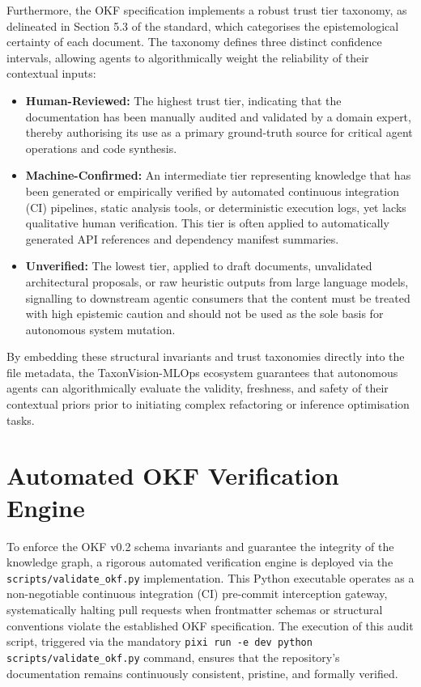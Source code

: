 Furthermore, the OKF specification implements a robust trust tier taxonomy, as delineated in Section 5.3 of the standard, which categorises the epistemological certainty of each document. The taxonomy defines three distinct confidence intervals, allowing agents to algorithmically weight the reliability of their contextual inputs:
\begin{itemize}
    \item \textbf{Human-Reviewed:} The highest trust tier, indicating that the documentation has been manually audited and validated by a domain expert, thereby authorising its use as a primary ground-truth source for critical agent operations and code synthesis.
    \item \textbf{Machine-Confirmed:} An intermediate tier representing knowledge that has been generated or empirically verified by automated continuous integration (CI) pipelines, static analysis tools, or deterministic execution logs, yet lacks qualitative human verification. This tier is often applied to automatically generated API references and dependency manifest summaries.
    \item \textbf{Unverified:} The lowest tier, applied to draft documents, unvalidated architectural proposals, or raw heuristic outputs from large language models, signalling to downstream agentic consumers that the content must be treated with high epistemic caution and should not be used as the sole basis for autonomous system mutation.
\end{itemize}

By embedding these structural invariants and trust taxonomies directly into the file metadata, the TaxonVision-MLOps ecosystem guarantees that autonomous agents can algorithmically evaluate the validity, freshness, and safety of their contextual priors prior to initiating complex refactoring or inference optimisation tasks.

\section{Automated OKF Verification Engine}
\label{sec:okf_verification_engine}

To enforce the OKF v0.2 schema invariants and guarantee the integrity of the knowledge graph, a rigorous automated verification engine is deployed via the \texttt{scripts/validate\_okf.py} implementation. This Python executable operates as a non-negotiable continuous integration (CI) pre-commit interception gateway, systematically halting pull requests when frontmatter schemas or structural conventions violate the established OKF specification. The execution of this audit script, triggered via the mandatory \texttt{pixi run -e dev python scripts/validate\_okf.py} command, ensures that the repository's documentation remains continuously consistent, pristine, and formally verified.

